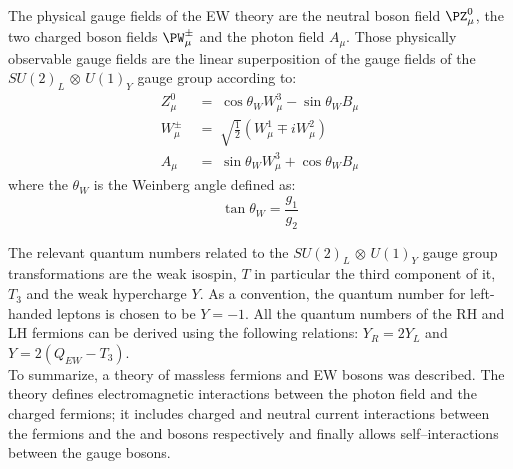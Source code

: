 The physical gauge fields of the EW  theory are the neutral \PZ boson field $\PZ^0_{\mu}$, the two charged \PW boson fields $\PW^{\pm}_{\mu}$ and the photon field $A_{\mu}$. Those physically observable gauge fields are the linear superposition of the gauge fields of the $SU(2)_{L}$ $\otimes$ $U(1)_{Y}$ gauge group according to:
\begin{align}
Z^0_{\mu} \; &= \; \cos\theta_{W} W^3_{\mu} - \sin\theta_{W} B_{\mu} \label{eq:z}\\
W^{\pm}_{\mu} \; &= \; \sqrt{\frac{1}{2}}(W^1_{\mu} \mp iW^2_{\mu}) \label{eq:w}\\
A_{\mu} \; &= \; \sin\theta_{W} W^3_{\mu} + \cos\theta_{W} B_{\mu} \label{eq:photon}
\end{align}
where the $\theta_W$ is the Weinberg angle defined as:
\begin{equation}
\label{eq:weinberg}
\tan \theta_W = \frac{g_1}{g_2}
\end{equation}

The relevant quantum numbers related to the $SU(2)_{L}$ $\otimes$ $U(1)_{Y}$ gauge group transformations are the weak isospin, $T$ in particular the third component of it, $T_3$ and the weak hypercharge $Y$. As a convention, the quantum number for left-handed leptons is chosen to be $Y = -1$. All the quantum numbers of the RH and LH fermions can be derived using the following relations: $Y_R = 2Y_L$ and $Y = 2(Q_{EW}-T_3)$.\\

To summarize, a theory of massless fermions and EW bosons was described. The theory defines electromagnetic interactions between the photon field and the charged fermions; it includes charged and neutral current interactions between the fermions and the \PW and \PZ bosons respectively and finally allows self–interactions between the gauge bosons. 

